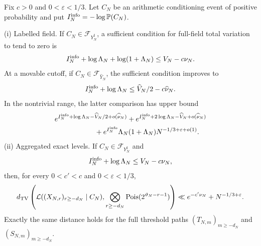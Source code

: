 \begin{theorem}\label{thm:moving-comparison}
Fix $c>0$ and $0<\varepsilon<1/3$. Let $C_N$ be an arithmetic
conditioning event of positive probability and
put $I_N^{\rm info}=-\log\mathbb P(C_N)$.

\textup{(i) Labelled field.} If $C_N\in\mathcal F_{Y_N^\sharp}$, a
sufficient condition for full-field total variation to tend to zero is
\begin{equation}\label{eq:labelled-hard-budget}
 I_N^{\rm info}+\log\Lambda_N+\log(1+\Lambda_N)\le V_N-c\nu_N.
\end{equation}
At a movable cutoff, if $C_N\in\mathcal F_{\widehat Y_N}$, the sufficient
condition improves to
\begin{equation}\label{eq:labelled-budget}
 I_N^{\rm info}+\log\Lambda_N\le\widehat V_N/2-c\widehat\nu_N.
\end{equation}
In the nontrivial range, the latter comparison has upper bound
\begin{align}
 &e^{I_N^{\rm info}+\log\Lambda_N-\widehat V_N/2+o(\widehat\nu_N)}
 +e^{I_N^{\rm info}+2\log\Lambda_N-\widehat V_N+o(\widehat\nu_N)}\notag\\
 &\hspace{20mm}+e^{I_N^{\rm info}}\Lambda_N(1+\Lambda_N)
                         N^{-1/3+\varepsilon+o(1)}.
 \label{eq:labelled-rate}
\end{align}
\textup{(ii) Aggregated exact levels.} If $C_N\in\mathcal F_{Y_N^\sharp}$
and
\begin{equation}\label{eq:staircase-budget}
 I_N^{\rm info}+\log\Lambda_N\le V_N-c\nu_N,
\end{equation}
then, for every $0<c'<c$ and $0<\varepsilon<1/3$,
\begin{equation}\label{eq:staircase-rate}
 d_{\mathrm{TV}}\left(\mathcal L((X_{N,r})_{r\ge-d_N}\mid C_N),
       \bigotimes_{r\ge-d_N}\operatorname{Pois}(2^{\vartheta_N-r-1})\right)
 \ll e^{-c'\nu_N}+N^{-1/3+\varepsilon}.
\end{equation}
Exactly the same distance holds for the full threshold paths
$(T_{N,m})_{m\ge-d_N}$ and $(S_{N,m})_{m\ge-d_N}$.
\end{theorem}
